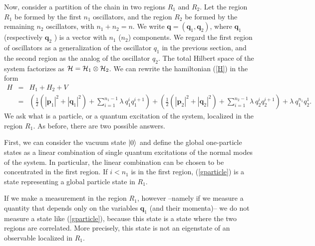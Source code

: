 \documentclass[10pt, nofootinbib]{revtex4}
\newcommand{\bea}{\begin{eqnarray}}
\newcommand{\eea}{\end{eqnarray}}
\begin{document}
Now, consider a partition of the chain in two regions $R_{1}$ and
$R_{2}$.  Let the region $R_{1}$ be formed by the first $n_{1}$
oscillators, and the region $R_{2}$ be formed by the remaining $n_{2}$
oscillators, with $n_{1}+n_{2}=n$.  We write $\mathbf q=(\mathbf
q_{1},\mathbf{q}_{2})$, where $\mathbf q_{1}$ (respectively $\mathbf
q_{2}$ ) is a vector with $n_{1}$ ($n_{2}$) components.  We regard the
first region of oscillators as a generalization of the oscillator
$q_{1}$ in the previous section, and the second region as the analog of
the oscillator $q_{2}$.  The total Hilbert space of the system
factorizes as ${\cal H}={\cal H}_{1}\otimes{\cal H}_{2}$.  We can
rewrite the hamiltonian (\ref{H}) in the form
%
\bea 
H&=& H_{1}+H_{2}+V 
\\ \nonumber &=& 
\left(\frac{1}{2}\left(|\mathbf p_1|^2 + |\mathbf q_1|^2
\right) + \sum_{i=1}^{n_{1}-1} \lambda \ q_{1}^iq_1^{i+1}\right)
+ \left(\frac{1}{2}\left(|\mathbf p_2|^2 + |\mathbf q_2|^2
\right) + \sum_{i=1}^{n_{2}-1} \lambda \ q_{2}^iq_2^{i+1}\right)
+ \lambda\ q_1^{n_{1}}q_2^1.
\eea
%
We ask what is a particle, or a quantum excitation of the system,
localized in the region $R_{1}$.  As before, there are two possible
answers.

First, we can consider the vacuum state $|0 \rangle_{\rm }$ and define
the global one-particle states as a linear combination of single
quantum excitations of the normal modes of the system.  In particular,
the linear combination can be chosen to be concentrated in the first
region.  If $i<n_{1}$ is in the first region, (\ref{gparticle}) is a
state representing a global particle state in $R_{1}$.

If we make a measurement in the region $R_{1}$, however --namely if
we measure a quantity that depends only on the variables $\mathbf
q_{1}$ (and their momenta)-- we do not measure a state like
(\ref{gparticle}), because this state is a state where the two regions
are correlated.  More precisely, this state is not an eigenstate of an
observable localized in $R_{1}$.  
\end{document}
